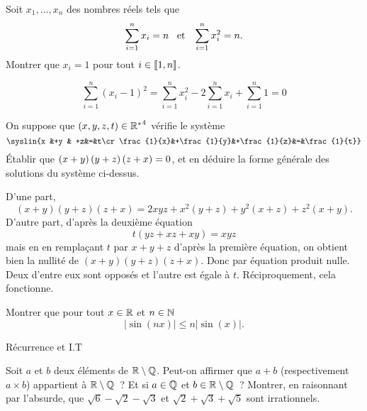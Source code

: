 \documentclass{magnolia}
\begin{document}
Soit $x_1,\ldots,x_n$ des nombres réels tels que
\[\sum_{i=1}^nx_i=n \quad\!\text{et}\quad\! \sum_{i=1}^nx_i^2=n.\]
Montrer que $x_i=1$ pour tout $i\in\left\llbracket 1,n\right\rrbracket$.

\begin{sol}
$$\sum_{i=1}^n(x_i-1)^2=\sum_{i=1}^nx_i^2-2\sum_{i=1}^nx_i+\sum_{i=1}^n 1=0$$
\end{sol}

On suppose que $\left(x,y,z,t\right)\in{\mathbb{R}^*}^4$ vérifie le système
\[\syslin{x          &+y          &          +z&=&t\cr
          \frac{1}{x}&+\frac{1}{y}&+\frac{1}{z}&=&\frac{1}{t}}\]
Établir que $\left(x+y\right)\left(y+z\right)\left(z+x\right)=0$, et en déduire la forme générale des
solutions du système ci-dessus.

\begin{sol}
D'une part, $$(x+y)(y+z)(z+x)=2xyz+x^2(y+z)+y^2(x+z)+z^2(x+y).$$
D'autre part, d'après la deuxième équation $$t(yz+xz+xy)=xyz$$ mais en en remplaçant $t$ par $x+y+z$ d'après la première équation, on obtient bien la nullité de $(x+y)(y+z)(z+x)$.
Donc par équation produit nulle. Deux d'entre eux sont opposés et l'autre est égale à $t$. Réciproquement, cela fonctionne.
\end{sol}





Montrer que pour tout $x\in \mathbb{R}$ et $n \in \mathbb{N}$
\[|\sin(nx)| \leq n |\sin(x)|.\]
\begin{sol}
Récurrence et I.T
\end{sol}


\begin{questions}
\question Soit $a$ et $b$ deux éléments de $\mathbb{R}\setminus\mathbb{Q}$. Peut-on affirmer
  que $a+b$ (respectivement $a\times b$) appartient à $\mathbb{R}\setminus\mathbb{Q}$~?
  Et si $a\in\mathbb{Q}$ et $b\in\mathbb{R}\setminus\mathbb{Q}$~?
\question Montrer, en raisonnant par l'absurde, que $\sqrt{6}-\sqrt{2}-\sqrt{3}$ et
  $\sqrt{2}+\sqrt{3}+\sqrt{5}$ sont irrationnels.
\end{questions}
\end{document}
